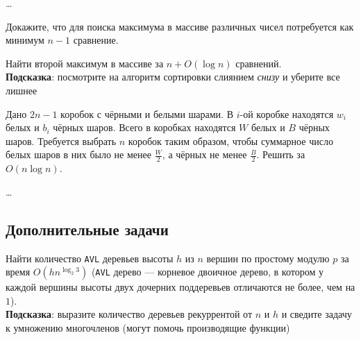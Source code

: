\begin{solution}
    \dots
\end{solution}


\begin{problem}
    Докажите, что для поиска максимума в массиве различных чисел потребуется как минимум $n-1$ сравнение.
\end{problem}

\begin{solution}
    \leavevmode\vspace{1pt}
    
\end{solution}


\begin{problem}
    Найти второй максимум в массиве за $n + O(\log n)$ сравнений. \\
    {\footnotesize \textbf{Подсказка}: посмотрите на алгоритм сортировки слиянием \textit{снизу} и уберите все лишнее}
\end{problem}

\begin{solution}
    \leavevmode\vspace{1pt}
    
\end{solution}


\begin{problem}
    Дано $2n - 1$ коробок с чёрными и белыми шарами.  В $i$-ой коробке находятся $w_i$ белых и $b_i$ чёрных шаров.
    Всего в коробках находятся $W$ белых и $B$ чёрных шаров.
    Требуется выбрать $n$ коробок таким образом, чтобы суммарное число белых шаров в них было не менее $\frac{W}{2}$,
    а чёрных не менее $\frac{B}{2}$. Решить за $O(n \log n)$.
\end{problem}

\begin{solution}
    \dots
\end{solution}


\subsection*{Дополнительные задачи}

\begin{problem}
    Найти количество \texttt{AVL} деревьев высоты $h$ из $n$ вершин по простому модулю $p$ за время $O(h n^{\log_2 3})$
    (\texttt{AVL} дерево --- корневое двоичное дерево, в котором у каждой вершины высоты двух дочерних поддеревьев отличаются не более, чем на $1$).\\
    {
        \footnotesize \textbf{Подсказка}: выразите количество деревьев рекуррентой от $n$ и $h$ и сведите задачу к умножению многочленов
        (могут помочь производящие функции)
    }
\end{problem}

